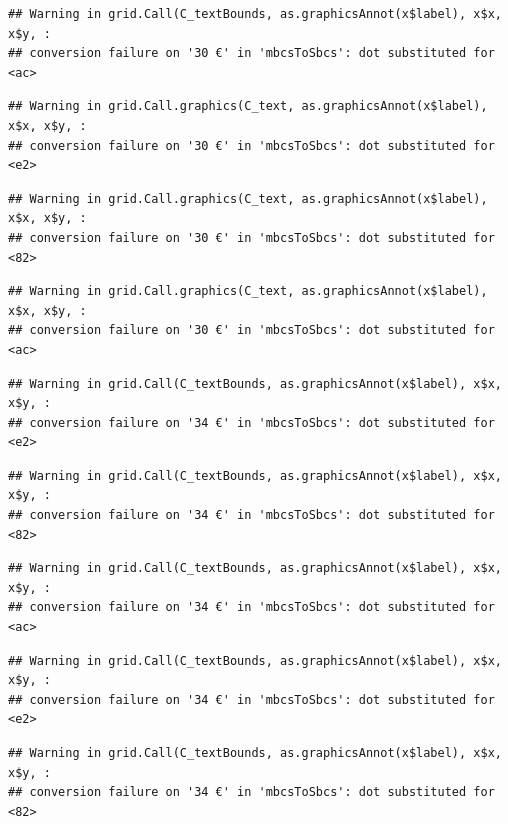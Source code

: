\documentclass[
]{article}
\begin{document}
\begin{verbatim}
## Warning in grid.Call(C_textBounds, as.graphicsAnnot(x$label), x$x, x$y, :
## conversion failure on '30 €' in 'mbcsToSbcs': dot substituted for <ac>
\end{verbatim}

\begin{verbatim}
## Warning in grid.Call.graphics(C_text, as.graphicsAnnot(x$label), x$x, x$y, :
## conversion failure on '30 €' in 'mbcsToSbcs': dot substituted for <e2>
\end{verbatim}

\begin{verbatim}
## Warning in grid.Call.graphics(C_text, as.graphicsAnnot(x$label), x$x, x$y, :
## conversion failure on '30 €' in 'mbcsToSbcs': dot substituted for <82>
\end{verbatim}

\begin{verbatim}
## Warning in grid.Call.graphics(C_text, as.graphicsAnnot(x$label), x$x, x$y, :
## conversion failure on '30 €' in 'mbcsToSbcs': dot substituted for <ac>
\end{verbatim}

\begin{verbatim}
## Warning in grid.Call(C_textBounds, as.graphicsAnnot(x$label), x$x, x$y, :
## conversion failure on '34 €' in 'mbcsToSbcs': dot substituted for <e2>
\end{verbatim}

\begin{verbatim}
## Warning in grid.Call(C_textBounds, as.graphicsAnnot(x$label), x$x, x$y, :
## conversion failure on '34 €' in 'mbcsToSbcs': dot substituted for <82>
\end{verbatim}

\begin{verbatim}
## Warning in grid.Call(C_textBounds, as.graphicsAnnot(x$label), x$x, x$y, :
## conversion failure on '34 €' in 'mbcsToSbcs': dot substituted for <ac>
\end{verbatim}

\begin{verbatim}
## Warning in grid.Call(C_textBounds, as.graphicsAnnot(x$label), x$x, x$y, :
## conversion failure on '34 €' in 'mbcsToSbcs': dot substituted for <e2>
\end{verbatim}

\begin{verbatim}
## Warning in grid.Call(C_textBounds, as.graphicsAnnot(x$label), x$x, x$y, :
## conversion failure on '34 €' in 'mbcsToSbcs': dot substituted for <82>
\end{verbatim}
\end{document}
